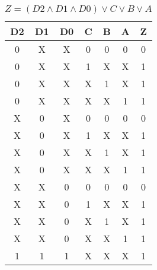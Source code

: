 \begin{center}
    \begin{table}[h] \caption{\(Z = (D2 \land D1 \land D0) \lor C \lor B \lor A \)}
        \begin{center}
            \begin{tabular}{|c|c|c|c|c|c||c|} \hline
            D2 & D1 & D0 & C & B & A & Z \\ \hline\hline
            0  & X  & X  & 0 & 0 & 0 & 0 \\ \hline
            0  & X  & X  & 1 & X & X & 1 \\ \hline
            0  & X  & X  & X & 1 & X & 1 \\ \hline
            0  & X  & X  & X & X & 1 & 1 \\ \hline
            X  & 0  & X  & 0 & 0 & 0 & 0 \\ \hline
            X  & 0  & X  & 1 & X & X & 1 \\ \hline
            X  & 0  & X  & X & 1 & X & 1 \\ \hline
            X  & 0  & X  & X & X & 1 & 1 \\ \hline
            X  & X  & 0  & 0 & 0 & 0 & 0 \\ \hline
            X  & X  & 0  & 1 & X & X & 1 \\ \hline
            X  & X  & 0  & X & 1 & X & 1 \\ \hline
            X  & X  & 0  & X & X & 1 & 1 \\ \hline
            1  & 1  & 1  & X & X & X & 1 \\ \hline
            \end{tabular}
        \end{center}
    \end{table}
\end{center}
